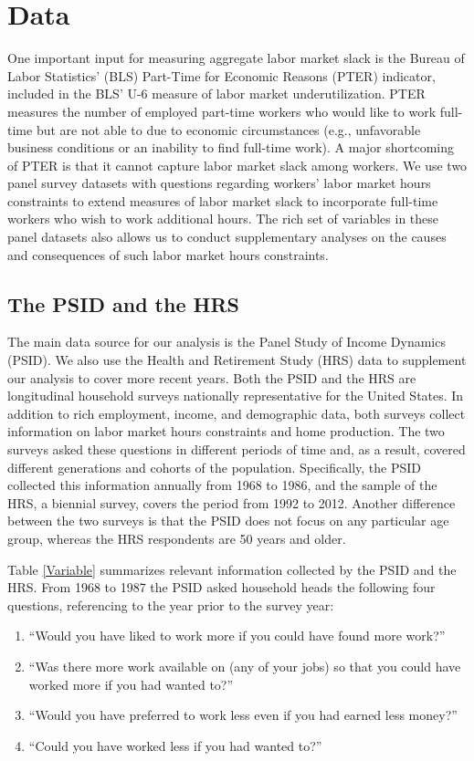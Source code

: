 \section{Data}

One important input for measuring aggregate labor market slack is the Bureau of Labor Statistics' (BLS) Part-Time for Economic Reasons (PTER) indicator, included in the BLS' U-6 measure of labor market underutilization. PTER measures the number of employed part-time workers who would like to work full-time but are not able to due to economic circumstances (e.g., unfavorable business conditions or an inability to find full-time work). A major shortcoming of PTER is that it cannot capture labor market slack among  workers. We use two panel survey datasets with questions regarding workers' labor market hours constraints to extend measures of labor market slack to incorporate full-time workers who wish to work additional hours. The rich set of variables in these panel datasets also allows us to conduct supplementary analyses on the causes and consequences of such labor market hours constraints.

\subsection{The PSID and the HRS}
The main data source for our analysis is the Panel Study of Income Dynamics (PSID). We also use the Health and Retirement Study (HRS) data to supplement our analysis to cover more recent years. Both the PSID and the HRS are longitudinal household surveys nationally representative for the United States. In addition to rich employment, income, and demographic data, both surveys collect information on labor market hours constraints and home production. The two surveys asked these questions in different periods of time and, as a result, covered different generations and cohorts of the population. Specifically, the PSID collected this information annually from 1968 to 1986, and the sample of the HRS, a biennial survey, covers the period from 1992 to 2012. Another difference between the two surveys is that the PSID does not focus on any particular age group, whereas the HRS respondents are 50 years and older.

Table \ref{Variable} summarizes relevant information collected by the PSID and the HRS. From 1968 to 1987 the PSID asked household heads the following four questions, referencing to the year prior to the survey year:

\begin{enumerate}
\item {``Would you have liked to work more if you could have found more work?''}

\item {``Was there more work available on (any of your jobs) so that you could have worked more if you had wanted to?''}

\item {``Would you have preferred to work less even if you had earned less money?''}

\item {``Could you have worked less if you had wanted to?''}
\end{enumerate}

